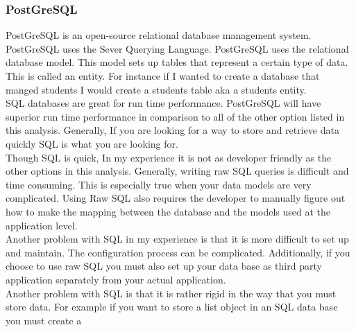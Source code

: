 \documentclass[letterpaper,10pt]{article}
\begin{document}
		\subsubsection{PostGreSQL}
				PostGreSQL is an open-source relational database management system. PostGreSQL uses the Sever Querying Language. PostGreSQL uses the relational database model. This model sets up tables that represent a certain type of data. This is called an entity. For instance if I wanted to create a database that manged students I would create a students table aka a students entity.\\
				SQL databases are great for run time performance. PostGreSQL will have superior run time performance in comparison to all of the other option listed in this analysis. Generally, If you are looking for a way to store and retrieve data quickly SQL is what you are looking for.\\
				Though SQL is quick, In my experience it is not as developer friendly as the other options in this analysis. Generally, writing raw SQL queries is difficult and time consuming. This is especially true when your data models are very complicated. Using Raw SQL also requires the developer to manually figure out how to make the mapping between the database and the models used at the application level.\\
				Another problem with SQL in my experience is that it is more difficult to set up and maintain. The configuration process can be complicated. Additionally, if you choose to use raw SQL you must also set up your data base as third party application separately from your actual application.\\
				Another problem with SQL is that it is rather rigid in the way that you must store data. For example if you want to store a list object in an SQL data base you must create a 
				
\end{document}

